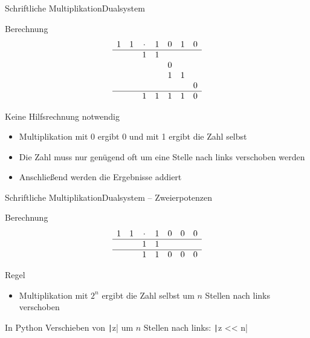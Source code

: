 \documentclass[xelatex,aspectratio=169]{beamer}
\begin{document}
\begin{frame}{Schriftliche Multiplikation}{Dualsystem}
  \begin{block}{Berechnung}
    \[
      \begin{matrix}
        1 & 1 & \cdot & 1 & 0 & 1 & 0 \\
        \hline
          &   & 1     & 1 &   &   &   \\
          &   &       &   & 0 &   &   \\
          &   &       &   & 1 & 1 &   \\
          &   &       &   &   &   & 0 \\
        \hline
          &   & 1     & 1 & 1 & 1 & 0 \\
      \end{matrix}
    \]
  \end{block}
  \begin{block}{Keine Hilfsrechnung notwendig}
    \begin{itemize}
      \item Multiplikation mit 0 ergibt 0 und  mit 1 ergibt die Zahl selbst
      \item Die Zahl muss nur genügend oft um eine Stelle nach links verschoben werden
      \item Anschließend werden die Ergebnisse addiert
    \end{itemize}

  \end{block}
\end{frame}

\begin{frame}{Schriftliche Multiplikation}{Dualsystem -- Zweierpotenzen}
  \begin{block}{Berechnung}
    \[
      \begin{matrix}
        1 & 1 & \cdot & 1 & 0 & 0 & 0 \\
        \hline
          &   & 1     & 1 &   &   &   \\
        \hline
          &   & 1     & 1 & 0 & 0 & 0 \\
      \end{matrix}
    \]
  \end{block}

  \begin{block}{Regel}
    \begin{itemize}
      \item Multiplikation mit $2^n$ ergibt die Zahl selbst um $n$ Stellen nach links verschoben
    \end{itemize}
  \end{block}

  \begin{exampleblock}{In Python}
    Verschieben von \texttt|z| um $n$ Stellen nach links: \texttt|z << n|
  \end{exampleblock}
\end{frame}
\end{document}

